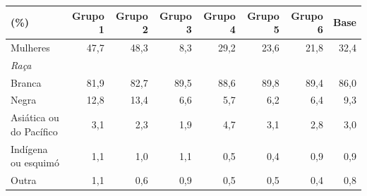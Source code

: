 \begin{tabular}{lrrrrrrr}
\toprule
(\%) & Grupo 1 & Grupo 2 & Grupo 3 & Grupo 4 & Grupo 5 & Grupo 6 & Base \\
\midrule
Mulheres & 47,7 & 48,3 & 8,3 & 29,2 & 23,6 & 21,8 & 32,4 \\
\midrule
\multicolumn{8}{l}{\emph{Raça}} \\
Branca & 81,9 & 82,7 & 89,5 & 88,6 & 89,8 & 89,4 & 86,0 \\
Negra & 12,8 & 13,4 & 6,6 & 5,7 & 6,2 & 6,4 & 9,3 \\
Asiática ou do Pacífico & 3,1 & 2,3 & 1,9 & 4,7 & 3,1 & 2,8 & 3,0 \\
Indígena ou esquimó & 1,1 & 1,0 & 1,1 & 0,5 & 0,4 & 0,9 & 0,9 \\
Outra & 1,1 & 0,6 & 0,9 & 0,5 & 0,5 & 0,4 & 0,8 \\
\bottomrule
\end{tabular}
